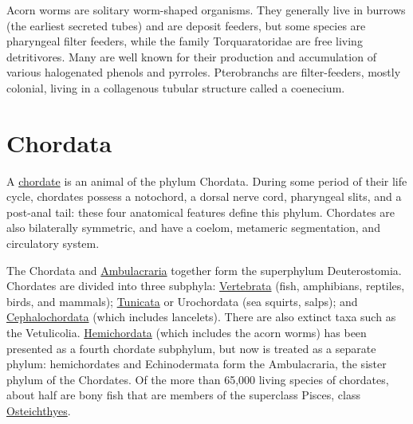Acorn worms are solitary worm-shaped organisms. They generally live in burrows (the earliest secreted tubes) and are deposit feeders, but some species are pharyngeal filter feeders, while the family Torquaratoridae are free living detritivores. Many are well known for their production and accumulation of various halogenated phenols and pyrroles. Pterobranchs are filter-feeders, mostly colonial, living in a collagenous tubular structure called a coenecium.

\hypertarget{chordata}{%
\section{Chordata}\label{chordata}}

A \href{https://en.wikipedia.org/wiki/Chordate}{chordate} is an animal of the phylum Chordata. During some period of their life cycle, chordates possess a notochord, a dorsal nerve cord, pharyngeal slits, and a post-anal tail: these four anatomical features define this phylum. Chordates are also bilaterally symmetric, and have a coelom, metameric segmentation, and circulatory system.

The Chordata and \href{https://en.wikipedia.org/wiki/Ambulacraria}{Ambulacraria} together form the superphylum Deuterostomia. Chordates are divided into three subphyla: \href{https://en.wikipedia.org/wiki/Vertebrate}{Vertebrata} (fish, amphibians, reptiles, birds, and mammals); \href{https://en.wikipedia.org/wiki/Tunicate}{Tunicata} or Urochordata (sea squirts, salps); and \href{https://en.wikipedia.org/wiki/Cephalochordate}{Cephalochordata} (which includes lancelets). There are also extinct taxa such as the Vetulicolia. \href{https://en.wikipedia.org/wiki/Hemichordate}{Hemichordata} (which includes the acorn worms) has been presented as a fourth chordate subphylum, but now is treated as a separate phylum: hemichordates and Echinodermata form the Ambulacraria, the sister phylum of the Chordates. Of the more than 65,000 living species of chordates, about half are bony fish that are members of the superclass Pisces, class \href{https://en.wikipedia.org/wiki/Osteichthyes}{Osteichthyes}.



